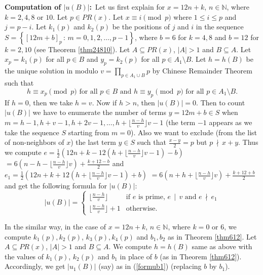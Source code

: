 \documentclass[11pt]{article}
\theoremstyle{definition}
\theoremstyle{remark}
\numberwithin{equation}{section}
\newcommand{\Nat}{\mathbb{N}}
\newcommand{\set}[1]{\left\{#1\right\}}
\newcommand{\Set}[2]{\set{#1\, :\, #2}}
\newcommand{\Mod}[3]{#1\equiv #2 \pmod{#3}}
\newcommand{\Div}[2]{#1\,\mid\, #2}
\newcommand{\nDiv}[2]{#1\,\nmid\, #2}
\begin{document}
\vspace{1em}
\noindent
{\bf Computation of $|u(B)|$:}\  Let us first explain for $x=12n+k$, $n\in\Nat$, where $k=2,4,8$ or $10$. Let $p\in PR(x)$. Let $\Mod{x}{i}{p}$ where $1\leq i\leq p$ and $j=p-i$. Let $k_1(p)$ and $k_2(p)$ be the positions of $j$ and $i$ in the sequence $S=\Set{[12m+b]_p}{m=0,1,2,\ldots,p-1}$, where $b=6$ for $k=4,8$ and $b=12$ for $k=2,10$ (see Theorem \ref{thm24810}). Let $A\subseteq PR(x)$, $|A|>1$ and $B\subseteq A$. Let $x_p=k_1(p)$ for all $p\in B$ and $y_p=k_2(p)$ for all $p\in A_1\setminus B$. Let $h=h(B)$ be the unique solution in modulo $v=\prod\limits_{p\in A_1\cup B} p$ by Chinese Remainder Theorem such that 
$$\Mod{h}{x_p}{p} \text{ for all } p\in B \text{ and }\Mod{h}{y_p}{p} \text{ for all }p\in A_1\setminus B.$$ 
If $h=0$, then we take $h=v$. Now if $h>n$, then $|u(B)|=0$. Then to count $|u(B)|$ we have to enumerate the number of terms $y=12m+b\in S$ when $m=h-1, h+v-1, h+2v-1,\ldots, h+\lfloor\frac{n-h}{v}\rfloor v-1$ (the term $-1$ appears as we take the sequence $S$ starting from $m=0$). Also we want to exclude (from the list of non-neighbors of $x$) the last term $y\in S$ such that $\frac{x-y}{2}=p$ but $\nDiv{p}{x+y}$. Thus 
we compute $e=\frac{1}{2}(12n+k-12(h+\lfloor\frac{n-h}{v}\rfloor v-1)-b)$ $=6(n-h-\lfloor\frac{n-h}{v}\rfloor v)+\frac{k+12-b}{2}$ and $e_1=\frac{1}{2}(12n+k+12(h+\lfloor\frac{n-h}{v}\rfloor v-1)+b)$ $=6(n+h+\lfloor\frac{n-h}{v}\rfloor v)+\frac{k+12+b}{2}$ and get the following formula for $|u(B)|$:
\begin{equation}\label{formub1}
|u(B)|=\left\{
\begin{array}{ll}
\lfloor\frac{n-h}{v}\rfloor & \text{if } e \text{ is prime, } \Div{e}{v} \text{ and }\nDiv{e}{e_1}\\
\lfloor\frac{n-h}{v}\rfloor +1 & \text{otherwise}.
\end{array}\right.
\end{equation}

\noindent
In the similar way, in the case of $x=12n+k$, $n\in\Nat$, where $k=0$ or $6$, we compute $k_1(p),k_2(p)$, $k_3(p),k_4(p)$ and $b_1,b_2$ as in Theorem \ref{thm612}. Let $A\subseteq PR(x)$, $|A|>1$ and $B\subseteq A$. We compute $h=h(B)$ same as above with the values of $k_1(p)$, $k_2(p)$ and $b_1$ in place of $b$ (as in Theorem \ref{thm612}). Accordingly, we get $|u_1(B)|$ (say) as in (\ref{formub1}) (replacing $b$ by $b_1$). 
\end{document}
